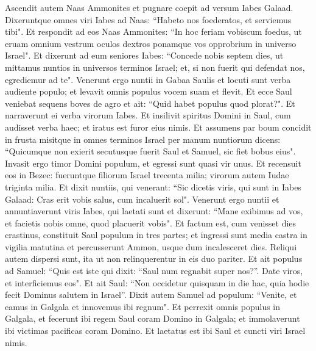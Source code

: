 \begin{biblechapter}  
\verse Ascendit autem Naas Ammonites et pugnare coepit ad versum Iabes Galaad. Dixeruntque omnes viri Iabes ad Naas: “Habeto nos foederatos, et serviemus tibi". 
\verse Et respondit ad eos Naas Ammonites: “In hoc feriam vobiscum foedus, ut eruam omnium vestrum oculos dextros ponamque vos opprobrium in universo Israel". 
\verse Et dixerunt ad eum seniores Iabes: “Concede nobis septem dies, ut mittamus nuntios in universos terminos Israel; et, si non fuerit qui defendat nos, egrediemur ad te". 
\verse Venerunt ergo nuntii in Gabaa Saulis et locuti sunt verba audiente populo; et levavit omnis populus vocem suam et flevit. 
\verse Et ecce Saul veniebat sequens boves de agro et ait: “Quid habet populus quod plorat?". Et narraverunt ei verba virorum Iabes. 
\verse Et insilivit spiritus Domini in Saul, cum audisset verba haec; et iratus est furor eius nimis. 
\verse Et assumens par boum concidit in frusta misitque in omnes terminos Israel per manum nuntiorum dicens: “Quicumque non exierit secutusque fuerit Saul et Samuel, sic fiet bobus eius". Invasit ergo timor Domini populum, et egressi sunt quasi vir unus. 
\verse Et recensuit eos in Bezec: fueruntque filiorum Israel trecenta milia; virorum autem Iudae triginta milia. 
\verse Et dixit nuntiis, qui venerant: “Sic dicetis viris, qui sunt in Iabes Galaad: Cras erit vobis salus, cum incaluerit sol". Venerunt ergo nuntii et annuntiaverunt viris Iabes, qui laetati sunt 
\verse et dixerunt: “Mane exibimus ad vos, et facietis nobis omne, quod placuerit vobis". 
\verse Et factum est, cum venisset dies crastinus, constituit Saul populum in tres partes; et ingressi sunt media castra in vigilia matutina et percusserunt Ammon, usque dum incalesceret dies. Reliqui autem dispersi sunt, ita ut non relinquerentur in eis duo pariter. 
\verse Et ait populus ad Samuel: “Quis est iste qui dixit: “Saul num regnabit super nos?”. Date viros, et interficiemus eos". 
\verse Et ait Saul: “Non occidetur quisquam in die hac, quia hodie fecit Dominus salutem in Israel”. 
\verse Dixit autem Samuel ad populum: “Venite, et eamus in Galgala et innovemus ibi regnum". 
\verse Et perrexit omnis populus in Galgala, et fecerunt ibi regem Saul coram Domino in Galgala; et immolaverunt ibi victimas pacificas coram Domino. Et laetatus est ibi Saul et cuncti viri Israel nimis. 
\end{biblechapter}

